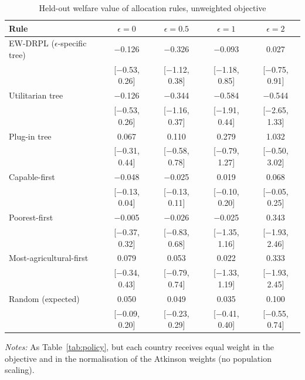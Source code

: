 \begin{table}[htbp]
\centering
\caption{Held-out welfare value of allocation rules, unweighted objective}\label{tab:unweighted}
\small
\begin{tabular}{lcccc}
\toprule
Rule & $\epsilon=0$ & $\epsilon=0.5$ & $\epsilon=1$ & $\epsilon=2$ \\
\midrule
EW-DRPL ($\epsilon$-specific tree) & $-$0.126 & $-$0.326 & $-$0.093 & 0.027 \\
 & {\footnotesize[$-$0.53, 0.26]} & {\footnotesize[$-$1.12, 0.38]} & {\footnotesize[$-$1.18, 0.85]} & {\footnotesize[$-$0.75, 0.91]} \\
Utilitarian tree & $-$0.126 & $-$0.344 & $-$0.584 & $-$0.544 \\
 & {\footnotesize[$-$0.53, 0.26]} & {\footnotesize[$-$1.16, 0.37]} & {\footnotesize[$-$1.91, 0.44]} & {\footnotesize[$-$2.65, 1.33]} \\
Plug-in tree & 0.067 & 0.110 & 0.279 & 1.032 \\
 & {\footnotesize[$-$0.31, 0.44]} & {\footnotesize[$-$0.58, 0.78]} & {\footnotesize[$-$0.79, 1.27]} & {\footnotesize[$-$0.50, 3.02]} \\
Capable-first & $-$0.048 & $-$0.025 & 0.019 & 0.068 \\
 & {\footnotesize[$-$0.13, 0.04]} & {\footnotesize[$-$0.13, 0.11]} & {\footnotesize[$-$0.10, 0.20]} & {\footnotesize[$-$0.05, 0.25]} \\
Poorest-first & $-$0.005 & $-$0.026 & $-$0.025 & 0.343 \\
 & {\footnotesize[$-$0.37, 0.32]} & {\footnotesize[$-$0.83, 0.68]} & {\footnotesize[$-$1.35, 1.16]} & {\footnotesize[$-$1.93, 2.46]} \\
Most-agricultural-first & 0.079 & 0.053 & 0.022 & 0.333 \\
 & {\footnotesize[$-$0.34, 0.43]} & {\footnotesize[$-$0.79, 0.74]} & {\footnotesize[$-$1.33, 1.19]} & {\footnotesize[$-$1.93, 2.45]} \\
Random (expected) & 0.050 & 0.049 & 0.035 & 0.100 \\
 & {\footnotesize[$-$0.09, 0.20]} & {\footnotesize[$-$0.23, 0.29]} & {\footnotesize[$-$0.41, 0.40]} & {\footnotesize[$-$0.55, 0.74]} \\
\bottomrule
\end{tabular}
\begin{minipage}{0.95\textwidth}\footnotesize\smallskip
\emph{Notes:} As Table~\ref{tab:policy}, but each country receives equal weight in the objective and
in the normalisation of the Atkinson weights (no population scaling).
\end{minipage}
\end{table}
